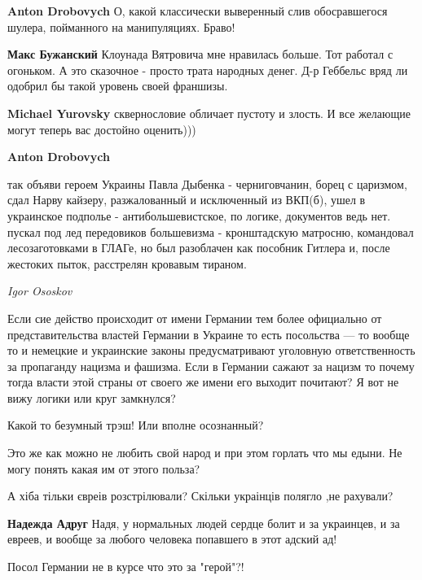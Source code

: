 \begin{itemize}
\begin{itemize}
\textbf{Anton Drobovych}
О, какой классически выверенный слив обосравшегося шулера, пойманного на манипуляциях.
Браво!

\textbf{Макс Бужанский}
Клоунада Вятровича мне нравилась больше. Тот работал с огоньком. А это сказочное - просто трата народных денег.
Д-р Геббельс вряд ли одобрил бы такой уровень своей франшизы.

\textbf{Michael Yurovsky} сквернословие обличает пустоту и злость. И все желающие могут теперь вас достойно оценить)))

\textbf{Anton Drobovych} 

так объяви героем Украины Павла Дыбенка - черниговчанин, борец с царизмом, сдал
Нарву кайзеру, разжалованный и исключенный из ВКП(б), ушел в украинское
подполье - антибольшевистское, по логике, документов ведь нет. пускал под лед
передовиков большевизма - кронштадскую матросню, командовал лесозаготовками в
ГЛАГе, но был разоблачен как пособник Гитлера и, после жестоких пыток,
расстрелян кровавым тираном.

\end{itemize} %

\emph{Igor Ososkov}

Если сие действо происходит от имени Германии тем более официально от
представительства властей Германии в Украине то есть посольства — то вообще то
и немецкие и украинские законы предусматривают уголовную ответственность за
пропаганду нацизма и фашизма. Если в Германии сажают за нацизм то почему тогда
власти этой страны от своего же имени его выходит почитают? Я вот не вижу
логики или круг замкнулся?


Какой то безумный трэш! Или вполне осознанный?

Это же как можно не любить свой народ и при этом горлать что мы едыни. Не могу понять какая им от этого польза?

А хіба тільки євреів розстрілювали? Скільки украінців полягло ,не рахували?

\begin{itemize} %
\textbf{Надежда Адруг} Надя, у нормальных людей сердце болит и за украинцев, и за евреев, и вообще за любого человека попавшего в этот адский ад!
\end{itemize} %

Посол Германии не в курсе что это за "герой"?!


\end{itemize}
